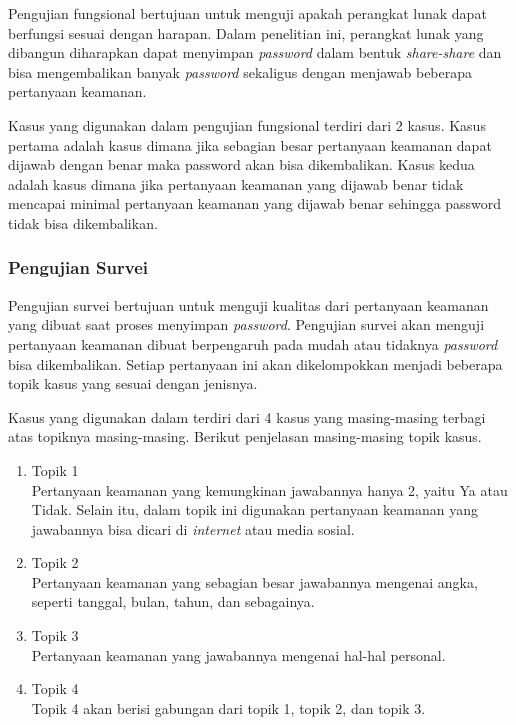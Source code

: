 Pengujian fungsional bertujuan untuk menguji apakah perangkat lunak dapat berfungsi sesuai dengan harapan. Dalam penelitian ini, perangkat lunak yang dibangun diharapkan dapat menyimpan \textit{password} dalam bentuk \textit{share-share} dan bisa mengembalikan banyak \textit{password} sekaligus dengan menjawab beberapa pertanyaan keamanan.

Kasus yang digunakan dalam pengujian fungsional terdiri dari 2 kasus. Kasus pertama adalah kasus dimana jika sebagian besar pertanyaan keamanan dapat dijawab dengan benar maka password akan bisa dikembalikan. Kasus kedua adalah kasus dimana jika pertanyaan keamanan yang dijawab benar tidak mencapai minimal pertanyaan keamanan yang dijawab benar sehingga password tidak bisa dikembalikan.

\subsubsection{Pengujian Survei}

Pengujian survei bertujuan untuk menguji kualitas dari pertanyaan keamanan yang dibuat saat proses menyimpan \textit{password}. Pengujian survei akan menguji pertanyaan keamanan dibuat berpengaruh pada mudah atau tidaknya \textit{password} bisa dikembalikan. Setiap pertanyaan ini akan dikelompokkan menjadi beberapa topik kasus yang sesuai dengan jenisnya.

Kasus yang digunakan dalam terdiri dari 4 kasus yang masing-masing terbagi atas topiknya masing-masing. Berikut penjelasan masing-masing topik kasus.

\begin{enumerate}[itemsep=0mm]
	\item Topik 1 \\
	Pertanyaan keamanan yang kemungkinan jawabannya hanya 2, yaitu Ya atau Tidak. Selain itu, dalam topik ini digunakan pertanyaan keamanan yang jawabannya bisa dicari di \textit{internet} atau media sosial.
	\item Topik 2 \\
	Pertanyaan keamanan yang sebagian besar jawabannya mengenai angka, seperti tanggal, bulan, tahun, dan sebagainya.
	\item Topik 3 \\
	Pertanyaan keamanan yang jawabannya mengenai hal-hal personal.
	\item Topik 4 \\
	Topik 4 akan berisi gabungan dari topik 1, topik 2, dan topik 3.
\end{enumerate}

